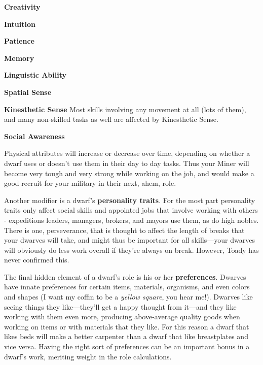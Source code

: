 \documentclass[]{article}
\newcommand{\boldlist}[1] {
\vspace{12pt}
\noindent \textbf{#1}
}
\begin{document}
\boldlist{Creativity}

\boldlist{Intuition}

\boldlist{Patience}

\boldlist{Memory}

\boldlist{Linguistic Ability}

\boldlist{Spatial Sense}

\boldlist{Kinesthetic Sense} Most skills involving any movement at all (lots of them), and many
non-skilled tasks as well are affected by Kinesthetic Sense.

\boldlist{Social Awareness}

\vspace{12pt}

Physical attributes will increase or decrease over time, depending on whether a dwarf uses
or doesn't use them in their day to day tasks. Thus your Miner will become very tough and very strong
while working on the job, and would make a good recruit for your military in their
next, ahem, role.

Another modifier is a dwarf's \textbf{personality traits}. For the most part
personality traits only affect social skills and appointed jobs that involve working with others -
expeditions leaders, managers, brokers, and mayors use them, as do high nobles. There is one,
perseverance, that is thought to affect the length of breaks that your dwarves will take, and might thus
be important for all skills---your dwarves will obviously do less work overall if they're
always on break. However, Toady has never confirmed this.

The final hidden element of a dwarf's role is his or her \textbf{preferences}. Dwarves
have innate preferences for certain items, materials, organisms, and even colors and shapes (I want my
coffin to be a \emph{yellow square}, you hear me!). Dwarves like seeing things they like---they'll get a
happy thought from it---and they like working with them even more, producing above-average quality goods
when working on items or with materials that they like. For this reason a dwarf that likes beds will
make a better carpenter than a dwarf that like breastplates and vice versa. Having the right sort of
preferences can be an important bonus in a dwarf's work, meriting weight in the role calculations.
\end{document}
